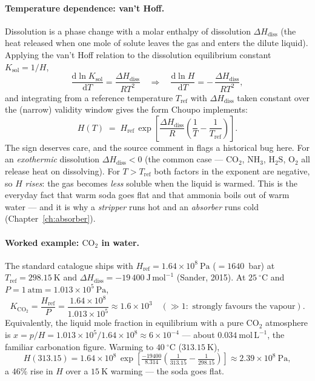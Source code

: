 \documentclass[11pt,a4paper]{article}
\begin{document}
\paragraph{Temperature dependence: van't Hoff.}  Dissolution is a
phase change with a molar enthalpy of dissolution $\Delta H_{\mathrm
{diss}}$ (the heat released when one mole of solute leaves the gas and
enters the dilute liquid).  Applying the van't Hoff relation to the
dissolution equilibrium constant $K_{\mathrm{sol}} = 1/H$,
\[
   \frac{\mathrm d \ln K_{\mathrm{sol}}}{\mathrm d T}
   = \frac{\Delta H_{\mathrm{diss}}}{R T^2}
   \quad\Longrightarrow\quad
   \frac{\mathrm d \ln H}{\mathrm d T}
   = -\,\frac{\Delta H_{\mathrm{diss}}}{R T^2},
\]
and integrating from a reference temperature $T_{\mathrm{ref}}$ with
$\Delta H_{\mathrm{diss}}$ taken constant over the (narrow) validity
window gives the form Choupo implements:
\begin{equation}
   \boxed{\;
   H(T) \;=\; H_{\mathrm{ref}}\,
   \exp\!\left[\frac{\Delta H_{\mathrm{diss}}}{R}
   \left(\frac{1}{T} - \frac{1}{T_{\mathrm{ref}}}\right)\right].
   \;}
   \label{eq:henry-vanthoff}
\end{equation}
The sign deserves care, and the source comment in
 flags a historical bug here.  For an
\emph{exothermic} dissolution $\Delta H_{\mathrm{diss}} < 0$ (the
common case --- $\mathrm{CO_2}$, $\mathrm{NH_3}$, $\mathrm{H_2S}$,
$\mathrm{O_2}$ all release heat on dissolving).  For $T > T_{\mathrm
{ref}}$ both factors in the exponent are negative, so $H$
\emph{rises}: the gas becomes \emph{less} soluble when the liquid is
warmed.  This is the everyday fact that warm soda goes flat and that
ammonia boils out of warm water --- and it is why a \emph{stripper}
runs hot and an \emph{absorber} runs cold
(Chapter~\ref{ch:absorber}).

\paragraph{Worked example: $\mathrm{CO_2}$ in water.}  The standard
catalogue ships  with $H_{\mathrm{ref}}
= 1.64\times10^{8}~\mathrm{Pa}$ ($=1640$~bar) at $T_{\mathrm{ref}} =
298.15~\mathrm K$ and $\Delta H_{\mathrm{diss}} = -19\,400~\mathrm
{J\,mol^{-1}}$ (Sander, 2015).  At $25~^\circ\mathrm C$ and $P =
1~\mathrm{atm} = 1.013\times10^{5}~\mathrm{Pa}$,
\[
   K_{\mathrm{CO_2}} = \frac{H_{\mathrm{ref}}}{P}
   = \frac{1.64\times10^{8}}{1.013\times10^{5}} \approx 1.6\times10^{3}
   \quad(\gg 1: \text{ strongly favours the vapour}).
\]
Equivalently, the liquid mole fraction in equilibrium with a pure
$\mathrm{CO_2}$ atmosphere is $x = p/H = 1.013\times10^{5}/1.64\times
10^{8} \approx 6\times10^{-4}$ --- about $0.034~\mathrm{mol\,L^{-1}}$,
the familiar carbonation figure.  Warming to $40~^\circ\mathrm C$
($313.15~\mathrm K$),
\[
   H(313.15) = 1.64\times10^{8}\,
   \exp\!\left[\tfrac{-19400}{8.314}\!\left(\tfrac{1}{313.15}
   - \tfrac{1}{298.15}\right)\right]
   \approx 2.39\times10^{8}~\mathrm{Pa},
\]
a $46\%$ rise in $H$ over a $15~\mathrm K$ warming --- the soda goes
flat.
\end{document}
